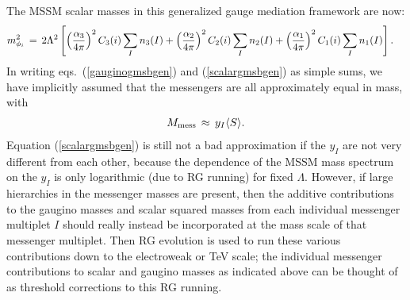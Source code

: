 \documentclass[11pt]{article}
\def\beq{\begin{eqnarray}}
\def\eeq{\end{eqnarray}}
\begin{document}
The MSSM scalar masses in this generalized gauge mediation framework are
now:
\beq  
m^2_{\phi_i} \,=\,
2 \Lambda^2
\left [ \left ({\alpha_3\over 4\pi}\right )^2 C_3(i) \sum_I n_3(I) +
\left ({\alpha_2\over 4 \pi}\right )^2 C_2(i) \sum_I n_2(I)+
\left ({\alpha_1\over 4 \pi}\right )^2 C_1(i) \sum_I n_1(I)
\right ] .\phantom{xx}
\label{scalargmsbgen}
\eeq
In writing eqs.~(\ref{gauginogmsbgen}) and (\ref{scalargmsbgen}) as simple
sums, we have implicitly assumed that the messengers are all approximately
equal in mass, with
\beq
M_{\rm mess} \,\approx\, y_I \langle S \rangle .
\eeq
Equation (\ref{scalargmsbgen}) is still not a bad approximation if the 
$y_I$ are not very different from each other, because the dependence of 
the MSSM mass spectrum on the $y_I$ is only logarithmic (due to RG 
running) for fixed $\Lambda$. However, if large hierarchies in the 
messenger masses are present, then the additive contributions to the 
gaugino masses and scalar squared masses from each individual messenger 
multiplet $I$ should really instead be incorporated at the mass scale of 
that messenger multiplet. Then RG evolution is used to run these various 
contributions down to the electroweak or TeV scale; the individual 
messenger contributions to scalar and gaugino masses as indicated above 
can be thought of as threshold corrections to this RG running.
\end{document}
